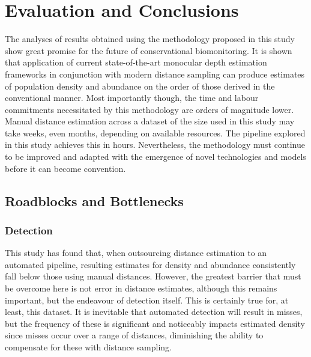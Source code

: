 \section{Evaluation and Conclusions}

The analyses of results obtained using the methodology proposed in this study show great
promise for the future of conservational biomonitoring.
It is shown that application of current state-of-the-art monocular depth estimation
frameworks in conjunction with modern distance sampling can produce estimates of population
density and abundance on the order of those derived in the conventional manner.
Most importantly though, the time and labour commitments necessitated by this methodology
are orders of magnitude lower.
Manual distance estimation across a dataset of the size used in this study may take weeks,
even months, depending on available resources.
The pipeline explored in this study achieves this in hours.
Nevertheless, the methodology must continue to be improved and adapted with the emergence
of novel technologies and models before it can become convention.

\subsection{Roadblocks and Bottlenecks}

\subsubsection{Detection}

This study has found that, when outsourcing distance estimation to an automated pipeline,
resulting estimates for density and abundance consistently fall below those using manual
distances.
However, the greatest barrier that must be overcome here is not error in distance estimates,
although this remains important, but the endeavour of detection itself.
This is certainly true for, at least, this dataset.
It is inevitable that automated detection will result in misses, but the frequency of these
is significant and noticeably impacts estimated density since misses occur over a range
of distances, diminishing the ability to compensate for these with distance sampling.

